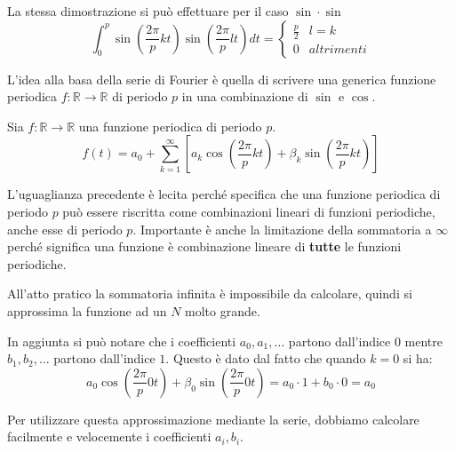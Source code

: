 La stessa dimostrazione si può effettuare per il caso $\sin \cdot \sin$
\begin{equation}
    \int_{0}^{p}\sin \left(\frac{2\pi}{p} kt\right) \sin \left(\frac{2\pi}{p} lt
    \right) dt = \begin{cases}
        \frac{p}{2} & l = k      \\
        0           & altrimenti
    \end{cases}
\end{equation}

L'idea alla basa della serie di Fourier è quella di scrivere una generica funzione
periodica $f:\mathbb{R}\to \mathbb{R}$ di periodo $p$ in una combinazione di $\sin$
e $\cos$.
\begin{definizione}
    Sia $f:\mathbb{R}\to \mathbb{R}$ una funzione periodica di periodo $p$.
    \begin{equation}
        f(t) = a_0 + \sum_{k=1}^{\infty} \left[a_k \cos (\frac{2\pi}{p}kt) +
            \beta_k \sin(\frac{2\pi}{p} kt)\right]
    \end{equation}
\end{definizione}

L'uguaglianza precedente è lecita perché specifica che una funzione periodica di
periodo $p$ può essere riscritta come combinazioni lineari di funzioni periodiche,
anche esse di periodo $p$. Importante è anche la limitazione della sommatoria a
$\infty$ perché significa una funzione è combinazione lineare di \textbf{tutte}
le funzioni periodiche.

All'atto pratico la sommatoria infinita è impossibile da calcolare, quindi si
approssima la funzione ad un $N$ molto grande.

In aggiunta si può notare che i coefficienti $a_0, a_1, \dots$ partono dall'indice
$0$ mentre $b_1,b_2,\dots$ partono dall'indice $1$. Questo è dato dal fatto che
quando $k = 0$ si ha:
\begin{equation*}
    a_0\cos (\frac{2\pi}{p}0t) +\beta_0\sin(\frac{2\pi}{p}0t) = a_0\cdot 1 + b_0
    \cdot 0 = a_0
\end{equation*}

Per utilizzare questa approssimazione mediante la serie, dobbiamo calcolare
facilmente e velocemente i coefficienti $a_i,b_i$.

